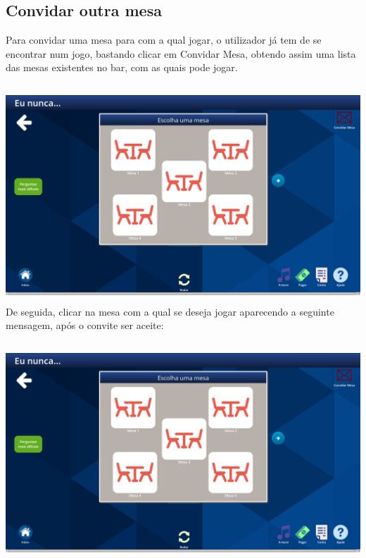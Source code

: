 \documentclass{article}
\begin{document}
\subsection{Convidar outra mesa}
Para convidar uma mesa para com a qual jogar, o utilizador já tem de se encontrar num jogo, bastando clicar em Convidar Mesa, obtendo assim uma lista das mesas existentes no bar, com as quais pode jogar.\\\\
\includegraphics[width=15cm, height=8cm]{user_manual_images/invite_table.png}
De seguida, clicar na mesa com a qual se deseja jogar aparecendo a seguinte mensagem, após o convite ser aceite:\\\\
\includegraphics[width=15cm, height=8cm]{user_manual_images/invite_table.png}
\end{document}
